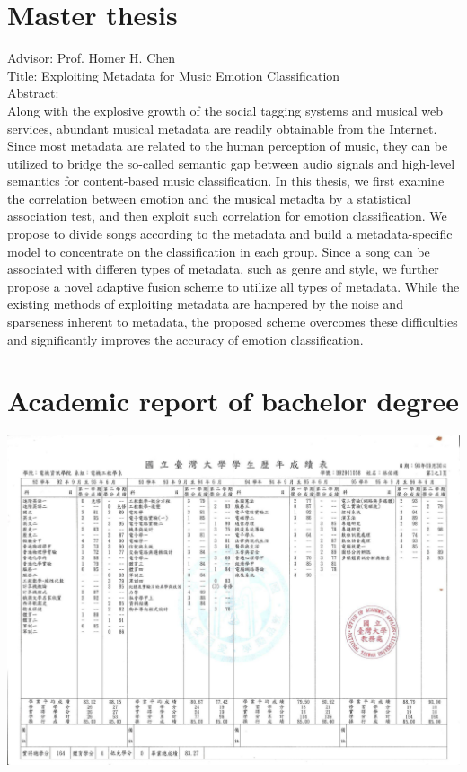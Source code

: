 \documentclass{res}
\begin{document}
\begin{CJK}{UTF8}{bsmi}
\begin{resume}
\section{Master thesis}
	Advisor: Prof. Homer H. Chen \\
	Title: Exploiting Metadata for Music Emotion Classification \\
	Abstract:\\

Along with the explosive growth of the social tagging systems and musical web services,
abundant musical metadata are readily obtainable from the Internet.
Since most metadata are related to the human perception of music, 
they can be utilized to bridge the so-called semantic gap 
between audio signals and high-level semantics for content-based music classification. 
In this thesis, we first examine the correlation between 
emotion and the musical metadta by a statistical association test,
and then exploit such correlation for emotion classification.
We propose to divide songs according to the metadata and 
build a metadata-specific model to concentrate on the classification in each group.
Since a song can be associated with differen types of metadata, such as genre and style,
we further propose a novel adaptive fusion scheme to utilize all types of metadata. 
While the existing methods of exploiting metadata are hampered 
by the noise and sparseness inherent to metadata, 
the proposed scheme overcomes these difficulties and 
significantly improves the accuracy of emotion classification.

\newpage
	\section{Academic report of bachelor degree}
	\vspace{0.3in}
	\includegraphics[angle=90,width=\textwidth]{copy1077.jpg}


\end{resume}
\end{CJK}
\end{document}
